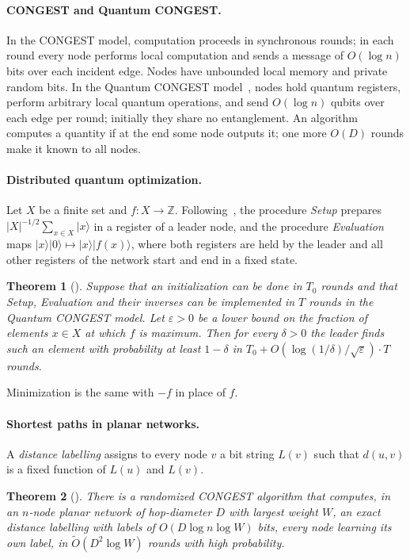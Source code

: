 \documentclass[11pt]{article}
\newtheorem{theorem}{Theorem}[section]
\theoremstyle{definition}
\theoremstyle{remark}
\newcommand{\Ot}{\tilde O}
\begin{document}
\paragraph{CONGEST and Quantum CONGEST.} In the CONGEST model, computation proceeds in synchronous rounds; in each round every node performs local computation and sends a message of $O(\log n)$ bits over each incident edge. Nodes have unbounded local memory and private random bits. In the Quantum CONGEST model~\cite{EKNP14,LM18}, nodes hold quantum registers, perform arbitrary local quantum operations, and send $O(\log n)$ qubits over each edge per round; initially they share no entanglement. An algorithm computes a quantity if at the end some node outputs it; one more $O(D)$ rounds make it known to all nodes.

\paragraph{Distributed quantum optimization.} Let $X$ be a finite set and $f\colon X\to\mathbb{Z}$. Following~\cite{LM18}, the procedure \emph{Setup} prepares $|X|^{-1/2}\sum_{x\in X}|x\rangle$ in a register of a leader node, and the procedure \emph{Evaluation} maps $|x\rangle|0\rangle\mapsto|x\rangle|f(x)\rangle$, where both registers are held by the leader and all other registers of the network start and end in a fixed state.

\begin{theorem}[{\cite[Theorem~7]{LM18}}]\label{thm:qopt}
Suppose that an initialization can be done in $T_0$ rounds and that Setup, Evaluation and their inverses can be implemented in $T$ rounds in the Quantum CONGEST model. Let $\varepsilon>0$ be a lower bound on the fraction of elements $x\in X$ at which $f$ is maximum. Then for every $\delta>0$ the leader finds such an element with probability at least $1-\delta$ in $T_0 + O(\log(1/\delta)/\sqrt\varepsilon)\cdot T$ rounds.
\end{theorem}

Minimization is the same with $-f$ in place of $f$.

\paragraph{Shortest paths in planar networks.}

A \emph{distance labelling} assigns to every node $v$ a bit string $L(v)$ such that $d(u,v)$ is a fixed function of $L(u)$ and $L(v)$.

\begin{theorem}[{\cite[Lemmas~5.1 and~5.2]{LP19}}]\label{thm:sssp}
There is a randomized CONGEST algorithm that computes, in an $n$-node planar network of hop-diameter $D$ with largest weight $W$, an exact distance labelling with labels of $O(D\log n\log W)$ bits, every node learning its own label, in $\Ot(D^2\log W)$ rounds with high probability.
\end{theorem}
\end{document}
